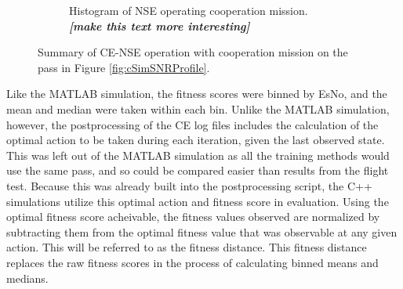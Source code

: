 \begin{figure}[ht]
\begin{subfigure}{\linewidth}
	\caption{Histogram of NSE operating cooperation mission. \textit{\textbf{[make this text more interesting]}}}
	\label{fig:cSimNSEHists}
\end{subfigure}
\caption{Summary of CE-NSE operation with cooperation mission on the pass in Figure \ref{fig:cSimSNRProfile}.}
\label{fig:c22NSECoop}
\end{figure}


\clearpage

\par Like the MATLAB simulation, the fitness scores were binned by EsNo, and the mean and median were taken within each bin. Unlike the MATLAB simulation, however, the postprocessing of the CE log files includes the calculation of the optimal action to be taken during each iteration, given the last observed state. This was left out of the MATLAB simulation as all the training methods would use the same pass, and so could be compared easier than results from the flight test. Because this was already built into the postprocessing script, the C++ simulations utilize this optimal action and fitness score in evaluation. Using the optimal fitness score acheivable, the fitness values observed are normalized by subtracting them from the optimal fitness value that was observable at any given action. This will be referred to as the fitness distance. This fitness distance replaces the raw fitness scores in the process of calculating binned means and medians.
